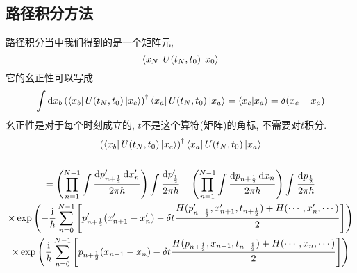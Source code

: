\documentclass{ctexart}
\begin{document}
\subsection{路径积分方法}
路径积分当中我们得到的是一个矩阵元, 
\begin{equation}
  \bra{x_N}U(t_N,t_0)\ket{x_0}
\end{equation}
它的幺正性可以写成
\begin{equation}
  \int \mathrm{d} x_b \left( \bra{x_b}U(t_N, t_0) \ket{x_c}\right) ^{\dagger} \bra{x_a}U(t_N,t_0)\ket{x_a} = \bra{x_c}\ket{x_a} = \delta(x_c - x_a)
\end{equation}
幺正性是对于每个时刻成立的, $t$不是这个算符(矩阵)的角标, 不需要对$t$积分.
\begin{equation}
  \begin{gathered}
    \left( \bra{x_b} U(t_N, t_0) \ket{x_c}\right)^{\dagger} \bra{x_a}U(t_N,t_0)\ket{x_a}
    \\ \\
    =  
    \left( \prod_{n=1}^{N-1} \int \frac{\mathrm{d} p'_{n+ \frac{1}{2}} \, \mathrm{d} x'_n}{2\pi \hbar} \right) \int  \frac{\mathrm{d} p'_{\frac{1}{2}}}{2\pi\hbar} 
    \quad
    \left( \prod_{n=1}^{N-1} \int \frac{\mathrm{d} p_{n+ \frac{1}{2}} \, \mathrm{d} x_n}{2\pi \hbar} \right) \int  \frac{\mathrm{d} p_{\frac{1}{2}}}{2\pi\hbar} 
    \\
    \times 
    \exp\left( 
      - \frac{\mathrm{i} }{\hbar} \sum_{n=0}^{N-1} \left[ p'_{n+ \frac{1}{2}}(x'_{n+1}- x'_n) - \delta t \frac{H(p'_{n+\frac{1}{2}},x'_{n+1}, t_{n+ \frac{1}{2}}) + H(\cdots, x'_{n},\cdots)}{2} \right] 
      \right)
    \\
    \times 
    \exp\left( 
      \frac{\mathrm{i} }{\hbar} \sum_{n=0}^{N-1} \left[ p_{n+ \frac{1}{2}}(x_{n+1}- x_n) - \delta t \frac{H(p_{n+\frac{1}{2}},x_{n+1}, t_{n+ \frac{1}{2}}) + H(\cdots, x_{n},\cdots)}{2} \right] 
      \right)
  \end{gathered}
\end{equation}
\end{document}
